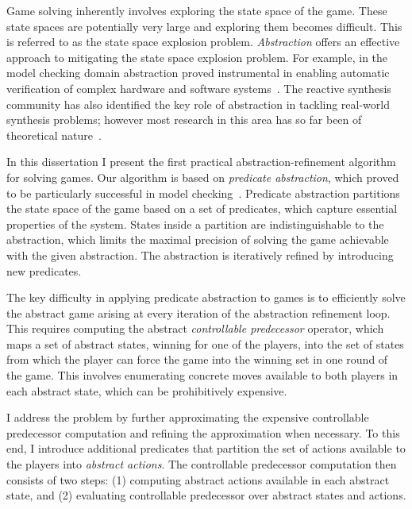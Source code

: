 Game solving inherently involves exploring the state space of the game. These state spaces are potentially very large and exploring them becomes difficult. This is referred to as the state space explosion problem. \emph{Abstraction} offers an effective approach to mitigating the state space explosion problem.  For example, in the model checking domain abstraction proved instrumental in enabling automatic verification of complex hardware and software systems~\cite{Clarke_GJLV_00,Clarke_KSY_04,Henzinger_JMS_02}.  The reactive synthesis community has also identified the key role of abstraction in tackling real-world synthesis problems; however most research in this area has so far been of theoretical nature~\cite{Alfaro_Roy_07,Henzinger_JM_03}.  

In this dissertation I present the first practical abstraction-refinement algorithm for solving games.  Our algorithm is based on \emph{predicate abstraction}, which proved to be particularly successful in model checking~\cite{Graf_Saidi_97}.  Predicate abstraction partitions the state space of the game based on a set of predicates, which capture essential properties of the system.  States inside a partition are indistinguishable to the abstraction, which limits the maximal precision of solving the game achievable with the given abstraction.  The abstraction is iteratively refined by introducing new predicates.

The key difficulty in applying predicate abstraction to games is to efficiently solve the abstract game arising at every iteration of the abstraction refinement loop.  This requires computing the abstract \emph{controllable predecessor} operator, which maps a set of abstract states, winning for one of the players, into the set of states from which the player can force the game into the winning set in one round of the game.  This involves enumerating concrete moves available to both players in each abstract state, which can be prohibitively expensive.  

I address the problem by further approximating the expensive controllable predecessor computation and refining the approximation when necessary. To this end, I introduce additional predicates that partition the set of actions available to the players into \emph{abstract actions}.  The controllable predecessor computation then consists of two steps: (1) computing abstract actions available in each abstract state, and (2) evaluating controllable predecessor over abstract states and actions.  

